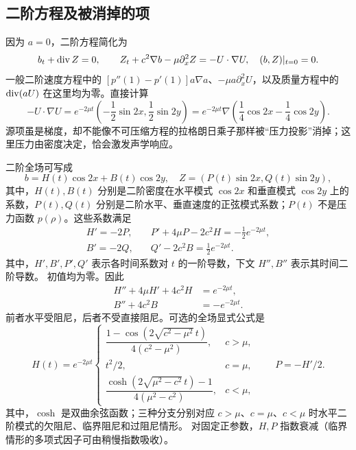 \subsection{二阶方程及被消掉的项}
因为 $a=0$，二阶方程简化为
\begin{equation}\label{eq:second}
 b_t+\operatorname{div} Z=0,\qquad
 Z_t+c^2\nabla b-\mu\partial_x^2Z=-U\cdot\nabla U,
 \quad (b,Z)|_{t=0}=0.
\end{equation}
一般二阶速度方程中的 $[p''(1)-p'(1)]a\nabla a$、$-\mu a\partial_x^2U$，以及质量方程中的 $\operatorname{div}(aU)$ 在这里均为零。直接计算
\begin{equation}\label{eq:force}
 -U\cdot\nabla U
 =e^{-2\mu t}\left(-\frac12\sin2x,\frac12\sin2y\right)
 =e^{-2\mu t}\nabla\left(\frac14\cos2x-\frac14\cos2y\right).
\end{equation}
源项虽是梯度，却不能像不可压缩方程的拉格朗日乘子那样被“压力投影”消掉；这里压力由密度决定，恰会激发声学响应。

二阶全场可写成
\begin{equation}\label{eq:fullsecond}
 b=H(t)\cos2x+B(t)\cos2y,\quad
 Z=(P(t)\sin2x,Q(t)\sin2y),
\end{equation}
其中，$H(t),B(t)$ 分别是二阶密度在水平模式 $\cos2x$ 和垂直模式 $\cos2y$ 上的系数，$P(t),Q(t)$ 分别是二阶水平、垂直速度的正弦模式系数；$P(t)$ 不是压力函数 $p(\rho)$。这些系数满足
\begin{align}
 H'=-2P,&\quad P'+4\mu P-2c^2H=-\tfrac12e^{-2\mu t},\label{eq:Hx}\\
 B'=-2Q,&\quad Q'-2c^2B=\tfrac12e^{-2\mu t}.\label{eq:BQ}
\end{align}
其中，$H',B',P',Q'$ 表示各时间系数对 $t$ 的一阶导数，下文 $H'',B''$ 表示其时间二阶导数。
初值均为零。因此
\begin{align}
 H''+4\mu H'+4c^2H&=e^{-2\mu t},\label{eq:HOde}\\
 B''+4c^2B&=-e^{-2\mu t}.\label{eq:BOde}
\end{align}
前者水平受阻尼，后者不受直接阻尼。可选的全场显式公式是
\[
 H(t)=e^{-2\mu t}
 \begin{cases}
 \dfrac{1-\cos(2\sqrt{c^2-\mu^2}\,t)}{4(c^2-\mu^2)},&c>\mu,\\[5pt]
 t^2/2,&c=\mu,\\[3pt]
 \dfrac{\cosh(2\sqrt{\mu^2-c^2}\,t)-1}{4(\mu^2-c^2)},&c<\mu,
 \end{cases}
 \qquad P=-H'/2.
\]
其中，$\cosh$ 是双曲余弦函数；三种分支分别对应 $c>\mu$、$c=\mu$、$c<\mu$ 时水平二阶模式的欠阻尼、临界阻尼和过阻尼情形。
对固定正参数，$H,P$ 指数衰减（临界情形的多项式因子可由稍慢指数吸收）。


